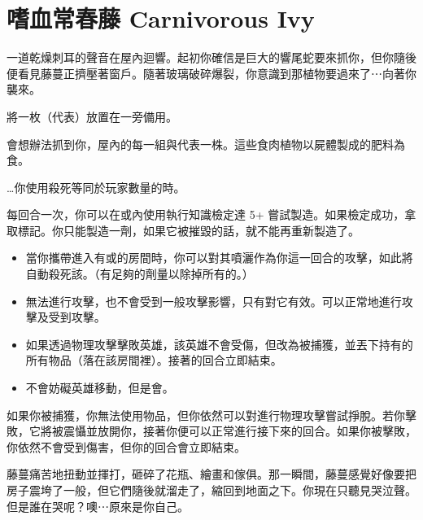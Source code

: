 
\chapter{嗜血常春藤 Carnivorous Ivy}

\begin{HauntStory}
  一道乾燥刺耳的聲音在屋內迴響。起初你確信是巨大的響尾蛇要來抓你，但你隨後便看見藤蔓正擠壓著窗戶。隨著玻璃破碎爆裂，你意識到那植物要過來了⋯向著你襲來。
\end{HauntStory}

將一枚（代表）放置在一旁備用。

會想辦法抓到你，屋內的每一組與代表一株。這些食肉植物以屍體製成的肥料為食。

…你使用殺死等同於玩家數量的時。

每回合一次，你可以在或內使用執行知識檢定達 5+ 嘗試製造。如果檢定成功，拿取標記。你只能製造一劑，如果它被摧毀的話，就不能再重新製造了。

\vfill\null\pagebreak

\vspace*{-1em}
\begin{itemize}
  \item 當你攜帶進入有或的房間時，你可以對其噴灑作為你這一回合的攻擊，如此將自動殺死該。（有足夠的劑量以除掉所有的。）
  \item {}無法進行攻擊，也不會受到一般攻擊影響，只有對它有效。可以正常地進行攻擊及受到攻擊。
  \item 如果透過物理攻擊擊敗英雄，該英雄不會受傷，但改為被捕獲，並丟下持有的所有物品（落在該房間裡）。接著的回合立即結束。
  \item {}不會妨礙英雄移動，但是會。
\end{itemize}

如果你被捕獲，你無法使用物品，但你依然可以對進行物理攻擊嘗試掙脫。若你擊敗，它將被震懾並放開你，接著你便可以正常進行接下來的回合。如果你被擊敗，你依然不會受到傷害，但你的回合會立即結束。

\begin{HauntStory}
  藤蔓痛苦地扭動並揮打，砸碎了花瓶、繪畫和傢俱。那一瞬間，藤蔓感覺好像要把房子震垮了一般，但它們隨後就溜走了，縮回到地面之下。你現在只聽見哭泣聲。但是誰在哭呢？噢⋯原來是你自己。
\end{HauntStory}
